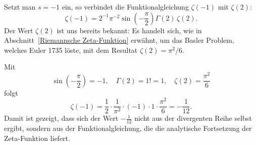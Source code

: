 Setzt man $s = -1$ ein, so verbindet die Funktionalgleichung $\zeta(-1)$ mit $\zeta(2)$:
\[
\zeta(-1) = 2^{-1} \pi^{-2} \sin\left(-\frac{\pi}{2}\right)\Gamma(2)\,\zeta(2).
\]
Der Wert $\zeta(2)$ ist uns bereits bekannt: Es handelt sich, wie in Abschnitt~\ref{Riemannsche Zeta-Funktion} erwähnt, um das Basler Problem, welches Euler 1735 löste, mit dem Resultat $\zeta(2) = \pi^2/6$.
%
%

Mit
\[
\sin\left(-\frac{\pi}{2}\right) = -1, \quad \Gamma(2) = 1! = 1, \quad \zeta(2) = \frac{\pi^2}{6}
\]
folgt
\[
\zeta(-1) = \frac{1}{2} \cdot \frac{1}{\pi^2} \cdot (-1) \cdot 1 \cdot \frac{\pi^2}{6} = -\frac{1}{12}.
\]
Damit ist gezeigt, dass sich der Wert $-\frac{1}{12}$ nicht aus der divergenten Reihe selbst ergibt, sondern aus der Funktionalgleichung, die die analytische Fortsetzung der Zeta-Funktion liefert.




